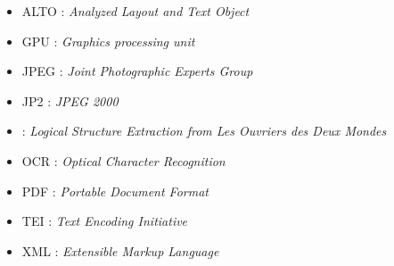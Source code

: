 \begin{itemize}
    \item ALTO : \textit{Analyzed Layout and Text Object}
    \item GPU : \textit{Graphics processing unit}
    \item JPEG : \textit{Joint Photographic Experts Group}
    \item JP2 : \textit{JPEG 2000}
    \item \lse{} : \textit{Logical Structure Extraction from Les Ouvriers des Deux Mondes}
    \item OCR : \textit{Optical Character Recognition}
    \item PDF : \textit{Portable Document Format}
    \item TEI : \textit{Text Encoding Initiative}
    \item XML : \textit{Extensible Markup Language}
\end{itemize}

\clearpage
\thispagestyle{empty}